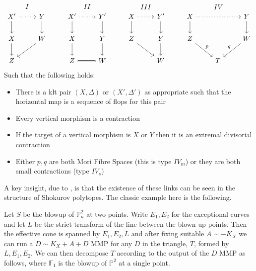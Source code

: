 \documentclass[a4paper,12pt]{book}
\begin{document}
	\[\begin{tikzcd}
	X' \arrow[d] \arrow[r, dotted] \arrow[r, "I", phantom, bend left=49] & Y \arrow[d]  & X' \arrow[r, dotted] \arrow[d] \arrow[r, "II",phantom, bend left=49] & Y' \arrow[d] & X \arrow[r, dotted] \arrow[d] \arrow[r, "III", phantom, bend left=49] & Y' \arrow[d] & X \arrow[d] \arrow[rr, dotted] \arrow[rr, "IV",phantom, bend left] &   & Y \arrow[d]       \\
	X \arrow[d]                                                          & W \arrow[ld] & X \arrow[d]                                               & Y \arrow[d]  & Z \arrow[rd]                                              & Y \arrow[d]  & Z \arrow[rd, "p"]                                          &   & W \arrow[ld, "q"'] \\
	Z                                                                    &              & Z \arrow[r, equal]                                                         & W            &                                                           & W            &                                                            & T &                  
	\end{tikzcd} \]
	Such that the following holds:
	\begin{itemize}
		\item There is a klt pair $(X,\Delta)$ or $(X',\Delta')$ as appropriate such that the horizontal map is a sequence of flops for this pair
		\item Every vertical morphism is a contraction
		\item If the target of a vertical morphism is $X$ or $Y$ then it is an extremal divisorial contraction
		\item Either $p,q$ are both Mori Fibre Spaces (this is type $IV_{m}$) or they are both small contractions (type $IV_{s}$)
	\end{itemize}
	
	A key insight, due to \cite{hacon2009sarkisov}, is that the existence of these links can be seen in the structure of Shokurov polytopes. The classic example here is the following.
	
	Let $S$ be the blowup of $\mathbb{P}^{2}_{\kappa}$ at two points. Write $E_{1},E_{2}$ for the exceptional curves and let $L$ be the strict transform of the line between the blown up points. Then the effective cone is spanned by $E_{1},E_{2},L$ and after fixing suitable $A \sim -K_{X}$ we can run a $D \sim K_{X}+A+D$ MMP for any $D$ in the triangle, $T$, formed by $L,E_{1},E_{2}$. We can then decompose $T$ according to the output of the $D$ MMP as follows, where $\mathbb{F}_{1}$ is the blowup of $\mathbb{P}^{2}$ at a single point.
	 
\end{document}
